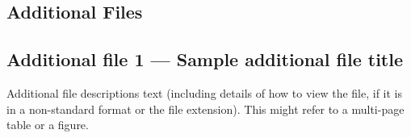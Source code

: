 \documentclass[twocolumn]{bmcart}%
\begin{document}
\begin{backmatter}

\section*{Additional Files}
  \subsection*{Additional file 1 --- Sample additional file title}
    Additional file descriptions text (including details of how to
    view the file, if it is in a non-standard format or the file extension).  This might
    refer to a multi-page table or a figure.



\end{backmatter}
\end{document}
